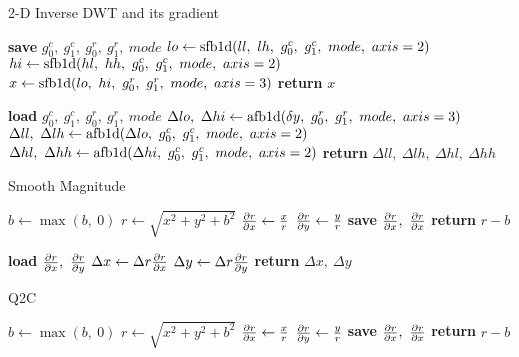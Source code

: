 \begin{algorithm}[h!]
\caption{2-D Inverse DWT and its gradient}\label{alg:ch3:idwt}
\begin{algorithmic}[1]
  \State \textbf{save} $g_0^c,\ g_1^c,\ g_0^r,\ g_1^r,\ mode$  \label{line:ch3:idwt_save}
  \State $lo \gets \F{sfb1d}(ll,\ lh,\ g_0^c,\ g_1^c,\ mode,\ axis=2) $
  \State $hi \gets \F{sfb1d}(hl,\ hh,\ g_0^c,\ g_1^c,\ mode,\ axis=2) $
  \State $x \gets \mathrm{sfb1d}(lo,\ hi,\ g_0^r,\ g_1^r,\ mode,\ axis=3) $
  \State \textbf{return} $x$
\EndFunction
\end{algorithmic}\vspace{10pt}
\begin{algorithmic}[1]
  \State \textbf{load} $g_0^c,\ g_1^c,\ g_0^r,\ g_1^r,\ mode$
  \State $\Delta lo,\ \Delta hi \gets \mathrm{afb1d}(\delta y,\ g_0^r,\ g_1^r,\ mode,\ axis=3)$ 
  \State $\Delta ll,\ \Delta lh \gets \F{afb1d}(\Delta lo,\ g_0^c,\ g_1^c,\ mode,\ axis=2)$ 
  \State $\Delta hl,\ \Delta hh \gets \F{afb1d}(\Delta hi,\ g_0^c,\ g_1^c,\ mode,\ axis=2)$ 
  \State \textbf{return} $\Delta ll,\ \Delta lh,\ \Delta hl,\ \Delta hh$
\EndFunction
\end{algorithmic}
\end{algorithm}

\begin{algorithm}[tb]
\caption{Smooth Magnitude}\label{alg:ch3:mag_smooth}
\begin{algorithmic}[1]
  \State $b \gets \max(b,\ 0)$
  \State $r \gets \sqrt{x^2 + y^2 + b^2}$
  \State $\frac{\partial r}{\partial x} \gets \frac{x}{r}$
  \State $\frac{\partial r}{\partial y} \gets \frac{y}{r}$
  \State \textbf{save} $\dydx{r}{x},\ \dydx{r}{x}$
  \State \textbf{return} $r - b$
\EndFunction
\end{algorithmic}\vspace{10pt}
\begin{algorithmic}[1]
  \State \textbf{load} $\dydx{r}{x},\ \dydx{r}{y}$
  \State $\Delta x \gets \Delta r \frac{\partial r}{\partial x}$
  \State $\Delta y \gets \Delta r \frac{\partial r}{\partial y}$
  \State \textbf{return} $\Delta x,\ \Delta y$
\EndFunction
\end{algorithmic}
\end{algorithm}

\begin{algorithm}[tb]
\caption{Q2C}\label{alg:ch3:q2c}
\begin{algorithmic}[1]
  \State $b \gets \max(b,\ 0)$
  \State $r \gets \sqrt{x^2 + y^2 + b^2}$
  \State $\frac{\partial r}{\partial x} \gets \frac{x}{r}$
  \State $\frac{\partial r}{\partial y} \gets \frac{y}{r}$
  \State \textbf{save} $\dydx{r}{x},\ \dydx{r}{x}$
  \State \textbf{return} $r - b$
\EndFunction
\end{algorithmic}\vspace{10pt}
\end{algorithm}
